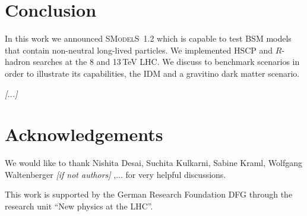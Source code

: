 \documentclass[preprint,number,sort&compress,twocolumn,3p]{elsstyarticle}
\newcommand{\smo}{\textsc{SModelS}}
\newcommand{\com}[1]{\emph{\color{red}[#1]}}  %
\begin{document}
\section{Conclusion}\label{sec:summary} 

In this work we announced \smo~1.2 which is capable to test BSM models 
that contain non-neutral long-lived particles. We implemented HSCP and $R$-hadron
searches at the 8 and 13\,TeV LHC\@. We discuss to benchmark scenarios in order to
illustrate its capabilities, the IDM and a gravitino dark matter scenario.

\com{...}

\section*{Acknowledgements}

We would like to thank Nishita Desai, Suchita Kulkarni, Sabine Kraml, Wolfgang Waltenberger \com{if not authors} ,... for very helpful discussions.

This work is supported by the German Research Foundation DFG through the 
research unit ``New physics at the LHC''. 
\end{document}
